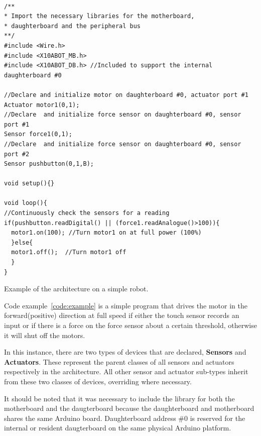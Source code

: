	\begin{listing}
		\footnotesize
		\begin{verbatim}

/**
* Import the necessary libraries for the motherboard, 
* daughterboard and the peripheral bus
**/
#include <Wire.h>  
#include <X10ABOT_MB.h>
#include <X10ABOT_DB.h> //Included to support the internal daughterboard #0

//Declare and initialize motor on daughterboard #0, actuator port #1
Actuator motor1(0,1);
//Declare  and initialize force sensor on daughterboard #0, sensor port #1
Sensor force1(0,1);
//Declare  and initialize force sensor on daughterboard #0, sensor port #2
Sensor pushbutton(0,1,B);

void setup(){}

void loop(){
//Continuously check the sensors for a reading
if(pushbutton.readDigital() || (force1.readAnalogue()>100)){
  motor1.on(100); //Turn motor1 on at full power (100%) 
  }else{
  motor1.off();  //Turn motor1 off
  }
}	 

		\end{verbatim}
		\caption{Example of the \xten architecture on a simple robot.} \label{code:example}
	\end{listing}



Code example~\ref{code:example} is a simple program that drives the motor in the forward(positive) direction at full speed if either the touch sensor records an input or if there is a force on the force sensor about a certain threshold, otherwise it will shut off the motors.

In this instance, there are two types of devices that are declared, \textbf{Sensors} and \textbf{Actuators}. These represent the parent classes of all sensors and actuators respectively in the \xten architecture. All other sensor and actuator sub-types inherit from these two classes of devices, overriding where necessary.

It should be noted that it was necessary to include the library for both the motherboard and the daugterboard because the daughterboard and motherboard shares the same Arduino board. Daughterboard address \#0 is reserved for the internal or resident daugterboard on the same physical Arduino platform.

